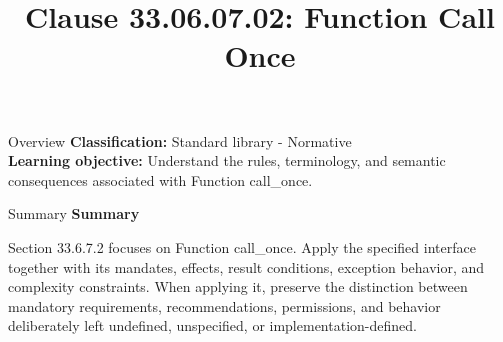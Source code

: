 \documentclass[10pt,letterpaper]{article}
\title{Clause 33.06.07.02: Function Call Once}
\author{}
\date{}
\begin{document}
\maketitle
\begin{CornellOverviewBox}{Overview}
\textbf{Classification:} Standard library - Normative\\[2pt]
\textbf{Learning objective:} Understand the rules, terminology, and semantic consequences associated with Function call\_once.
\end{CornellOverviewBox}\begin{CornellSummaryBox}{Summary}
{\sffamily\bfseries\color{Accent} Summary}\par\vspace{3pt}Section 33.6.7.2 focuses on Function call\_once. Apply the specified interface together with its mandates, effects, result conditions, exception behavior, and complexity constraints. When applying it, preserve the distinction between mandatory requirements, recommendations, permissions, and behavior deliberately left undefined, unspecified, or implementation-defined.
\end{CornellSummaryBox}
\end{document}
